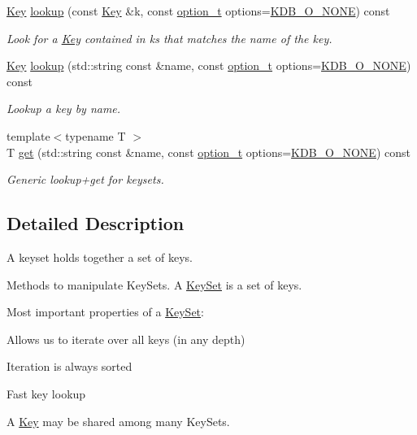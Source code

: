 \begin{DoxyCompactItemize}
\hyperlink{classkdb_1_1Key}{Key} \hyperlink{classkdb_1_1KeySet_a78125fb19c6aebb0d8fc1a7238b78ace}{lookup} (const \hyperlink{classkdb_1_1Key}{Key} \&k, const \hyperlink{group__keyset_ga98a3d6a4016c9dad9cbd1a99a9c2a45a}{option\+\_\+t} options=\hyperlink{group__keyset_gga98a3d6a4016c9dad9cbd1a99a9c2a45aa00738455e0ae843c8720809d8287f370}{K\+D\+B\+\_\+\+O\+\_\+\+N\+O\+NE}) const
\begin{DoxyCompactList}\small\item\em Look for a \hyperlink{classkdb_1_1Key}{Key} contained in {\ttfamily ks} that matches the name of the {\ttfamily key}. \end{DoxyCompactList}\item 
\hyperlink{classkdb_1_1Key}{Key} \hyperlink{classkdb_1_1KeySet_ac17f3423b3a55821ffeab556af89a4f7}{lookup} (std\+::string const \&name, const \hyperlink{group__keyset_ga98a3d6a4016c9dad9cbd1a99a9c2a45a}{option\+\_\+t} options=\hyperlink{group__keyset_gga98a3d6a4016c9dad9cbd1a99a9c2a45aa00738455e0ae843c8720809d8287f370}{K\+D\+B\+\_\+\+O\+\_\+\+N\+O\+NE}) const
\begin{DoxyCompactList}\small\item\em Lookup a key by name. \end{DoxyCompactList}\item 
{\footnotesize template$<$typename T $>$ }\\T \hyperlink{classkdb_1_1KeySet_ad0b7d6498cf0b51ca6672704939a7f24}{get} (std\+::string const \&name, const \hyperlink{group__keyset_ga98a3d6a4016c9dad9cbd1a99a9c2a45a}{option\+\_\+t} options=\hyperlink{group__keyset_gga98a3d6a4016c9dad9cbd1a99a9c2a45aa00738455e0ae843c8720809d8287f370}{K\+D\+B\+\_\+\+O\+\_\+\+N\+O\+NE}) const
\begin{DoxyCompactList}\small\item\em Generic lookup+get for keysets. \end{DoxyCompactList}\end{DoxyCompactItemize}


\subsection{Detailed Description}
A keyset holds together a set of keys. 

Methods to manipulate Key\+Sets. A \hyperlink{classkdb_1_1KeySet}{Key\+Set} is a set of keys.

Most important properties of a \hyperlink{classkdb_1_1KeySet}{Key\+Set}\+:


\begin{DoxyItemize}
\item Allows us to iterate over all keys (in any depth)
\item Iteration is always sorted
\item Fast key lookup
\item A \hyperlink{classkdb_1_1Key}{Key} may be shared among many Key\+Sets.
\end{DoxyItemize}


